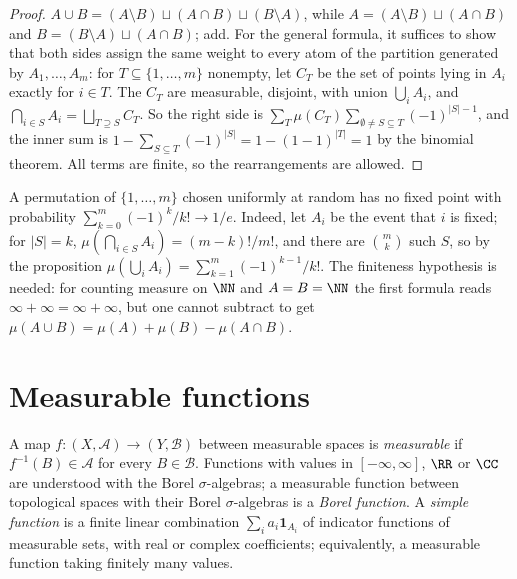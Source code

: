 \begin{proof}
$A \cup B = (A \setminus B) \sqcup (A \cap B) \sqcup (B \setminus A)$, while $A = (A \setminus B) \sqcup (A \cap B)$ and $B = (B \setminus A) \sqcup (A \cap B)$; add. For the general formula, it suffices to
show that both sides assign the same weight to every atom of the partition generated by $A_1, \ldots, A_m$: for $T \subseteq \{1, \ldots, m\}$ nonempty, let $C_T$ be the set of points lying in $A_i$
exactly for $i \in T$. The $C_T$ are measurable, disjoint, with union $\bigcup_iA_i$, and $\bigcap_{i \in S}A_i = \bigsqcup_{T \supseteq S}C_T$. So the right side is
$\sum_T\mu(C_T)\sum_{\emptyset \neq S \subseteq T}(-1)^{|S| - 1}$, and the inner sum is $1 - \sum_{S \subseteq T}(-1)^{|S|} = 1 - (1 - 1)^{|T|} = 1$ by the binomial theorem. All terms are finite, so the
rearrangements are allowed.
\end{proof}

\begin{example}\label{measure-theory:example-inclusion-exclusion}
A permutation of $\{1, \ldots, m\}$ chosen uniformly at random has no fixed point with probability $\sum_{k=0}^m(-1)^k/k! \to 1/e$. Indeed, let $A_i$ be the event that $i$ is fixed; for $|S| = k$,
$\mu(\bigcap_{i \in S}A_i) = (m - k)!/m!$, and there are $\binom mk$ such $S$, so by the proposition $\mu(\bigcup_iA_i) = \sum_{k=1}^m(-1)^{k-1}/k!$. The finiteness hypothesis is needed: for counting
measure on $\NN$ and $A = B = \NN$ the first formula reads $\infty + \infty = \infty + \infty$, but one cannot subtract to get $\mu(A \cup B) = \mu(A) + \mu(B) - \mu(A \cap B)$.
\end{example}

\section{Measurable functions}\label{measure-theory:section-measurable-functions}

\begin{definition}\label{measure-theory:definition-measurable-function}
A map $f \colon (X, \mathcal{A}) \to (Y, \mathcal{B})$ between measurable spaces is \emph{measurable} if $f^{-1}(B) \in \mathcal{A}$ for every $B \in \mathcal{B}$. Functions with values in $[-\infty, \infty]$,
$\RR$ or $\CC$ are understood with the Borel $\sigma$-algebras; a measurable function between topological spaces with their Borel $\sigma$-algebras is a \emph{Borel function}. A \emph{simple function} is a
finite linear combination $\sum_ia_i\mathbf{1}_{A_i}$ of indicator functions of measurable sets, with real or complex coefficients; equivalently, a measurable function taking finitely many values.
\end{definition}

